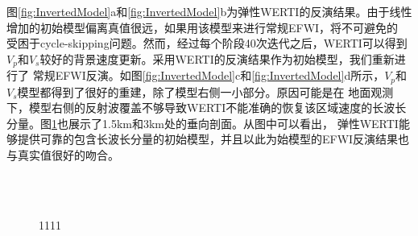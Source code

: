 图\ref{fig:InvertedModel}a和\ref{fig:InvertedModel}b为弹性WERTI的反演结果。由于线性增加的初始模型偏离真值很远，如果用该模型来进行常规EFWI，将不可避免的
受困于cycle-skipping问题。然而，经过每个阶段40次迭代之后，WERTI可以得到$V_p$和$V_s$较好的背景速度更新。采用WERTI的反演结果作为初始模型，我们重新进行了
常规EFWI反演。如图\ref{fig:InvertedModel}c和\ref{fig:InvertedModel}d所示，$V_p$和$V_s$模型都得到了很好的重建，除了模型右侧一小部分。原因可能是在
地面观测下，模型右侧的反射波覆盖不够导致WERTI不能准确的恢复该区域速度的长波长分量。图\ref{fig:Profiles}也展示了1.5km和3km处的垂向剖面。从图中可以看出，
弹性WERTI能够提供可靠的包含长波长分量的初始模型，并且以此为始模型的EFWI反演结果也与真实值很好的吻合。
\begin{figure}[!htb]
   \centering
   \\
   \\
   \caption{1111}
   \label{fig:Profiles}
\end{figure}
